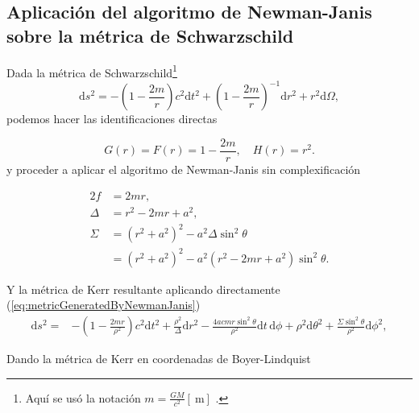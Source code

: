\subsection{Aplicación del algoritmo de Newman-Janis sobre la métrica de Schwarzschild}
Dada la métrica de Schwarzschild\footnote{Aquí se usó la notación $m=\frac{G M}{c^2}[\mathrm{~m}]$ .}
\begin{equation}
    \mathrm{d} s^2=-\left(1-\frac{2 m}{r}\right) c^2 \mathrm{d}  t^2+\left(1-\frac{2m}{r}\right)^{-1} \mathrm{d} r^2+r^2\mathrm{d} \Omega,
\end{equation}
podemos hacer las identificaciones directas

\begin{equation}
    G(r) = F(r) = 1-\frac{2m}{r}, \quad H(r) = r^2.
\end{equation}
y proceder a aplicar el algoritmo de Newman-Janis sin complexificación

\begin{equation}
    \begin{aligned}
        2f     & =  2mr,                                                        \\
        \Delta & = r^2 - 2mr + a^2,                                             \\
        \Sigma & = \left(r^2+a^2\right)^2-a^2 \Delta \sin ^2 \theta             \\
               & =\left(r^2+a^2\right)^2-a^2 (r^2 - 2mr + a^2) \sin ^2 \theta .
    \end{aligned}
\end{equation}

Y la métrica de Kerr resultante aplicando directamente (\ref{eq:metricGeneratedByNewmanJanis})
\begin{align}
    \mathrm{d}s^2 = &
    - \left(1 - \frac{2mr}{\rho^2}\right) c^2 \mathrm{d}t^2
    + \frac{\rho^2}{\Delta} \mathrm{d}r^2
    - \frac{4a c mr \sin^2\theta}{\rho^2} \mathrm{d}t\, \mathrm{d}\phi
    + \rho^2 \mathrm{d}\theta^2
    + \frac{\Sigma \sin^2\theta}{\rho^2} \mathrm{d}\phi^2,
\end{align}

Dando la métrica de Kerr en coordenadas de Boyer-Lindquist

